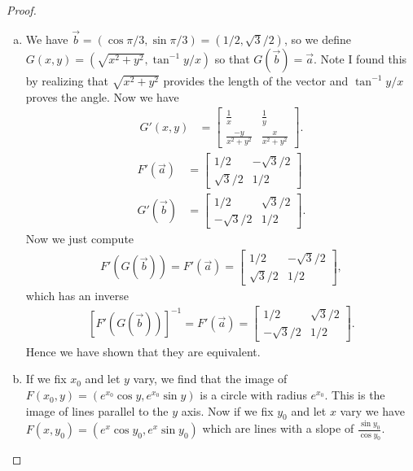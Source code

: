 \documentclass[leqno]{article}
\theoremstyle{nonumberplain}
\newtheorem{proof}{Proof}
\begin{document}
\begin{proof}
\begin{enumerate}[(a)]
\item We have $\vec{b}=(\cos \pi/3, \sin \pi/3)=(1/2,\sqrt{3}/2)$, so we define $G(x,y)=(\sqrt{x^2+y^2},\tan^{-1} y/x)$ so that $G(\vec{b})=\vec{a}$. Note I found this by realizing that $\sqrt{x^2+y^2}$ provides the length of the vector and $\tan^{-1} y/x$ proves the angle. Now we have
\begin{align*}
G'(x,y)&=\begin{bmatrix}
\frac{1}{x} & \frac{1}{y}\\
\frac{-y}{x^2+y^2} & \frac{x}{x^2+y^2}
\end{bmatrix}.
\end{align*}
\begin{align*}
F'(\vec{a})&=\begin{bmatrix}
1/2 & -\sqrt{3}/2\\
\sqrt{3}/2 & 1/2
\end{bmatrix}\\
G'(\vec{b})&=\begin{bmatrix}
1/2 & \sqrt{3}/2\\
-\sqrt{3}/2 & 1/2
\end{bmatrix}.
\end{align*}
Now we just compute 
\begin{align*}
F'(G(\vec{b}))=F'(\vec{a})=\begin{bmatrix}
1/2 & -\sqrt{3}/2\\
\sqrt{3}/2 & 1/2
\end{bmatrix},
\end{align*}
which has an inverse 
\begin{align*}
\left[F'(G(\vec{b}))\right]^{-1}=F'(\vec{a})=\begin{bmatrix}
1/2 & \sqrt{3}/2\\
-\sqrt{3}/2 & 1/2
\end{bmatrix}.
\end{align*}
Hence we have shown that they are equivalent.

\item If we fix $x_0$ and let $y$ vary, we find that the image of $F(x_0,y)=(e^{x_0}\cos y, e^{x_0} \sin y)$ is a circle with radius $e^{x_0}$.  This is the image of lines parallel to the $y$ axis. Now if we fix $y_0$ and let $x$ vary we have $F(x,y_0)=(e^{x} \cos y_0, e^{x} \sin y_0)$ which are lines with a slope of $\frac{\sin y_0}{\cos y_0}$.
\end{enumerate}
\end{proof}
\pagebreak
\end{document}
